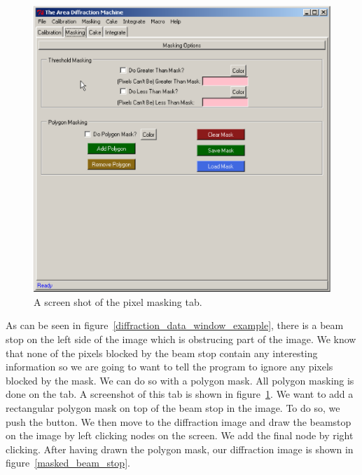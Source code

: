 \begin{figure}
    \centering
    \includegraphics[scale=.75]{figures/masking_page.eps}
    \caption{A screen shot of the pixel masking tab.}
    \label{masking_page_example}
\end{figure}

As can be seen in figure~\ref{diffraction_data_window_example},
there is a beam stop on the left side of the image which is
obstrucing part of the image. We know that none of the pixels
blocked by the beam stop contain any interesting information
so we are going to want to tell the program to ignore any pixels
blocked by the mask. We can do so with a polygon mask. All
polygon masking is done on the  tab. A screenshot
of this tab is shown in figure~\ref{masking_page_example}.
We want to add a rectangular polygon mask on top of the beam
stop in the image. To do so, we push the  button.
We then move to the diffraction image and draw the beamstop
on the image by left clicking nodes on the screen. We add the
final node by right clicking. After having drawn the polygon mask, 
our diffraction image is shown in figure~\ref{masked_beam_stop}.

